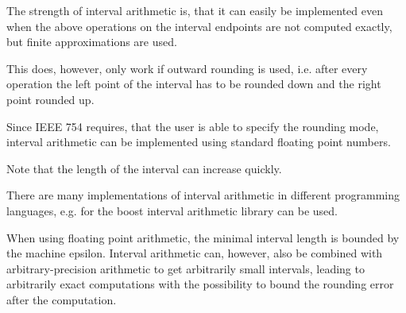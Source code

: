 	The strength of interval arithmetic is, that it can easily be implemented even when the above 
	operations on the interval endpoints are not computed exactly, but finite approximations are used.
	
	This does, however, only work if outward rounding is used, i.e. 
	after every operation the left point of the interval has to be rounded down and the right point rounded up.

	Since IEEE 754 requires, that the user is able to specify the rounding mode, interval arithmetic can be implemented 
	using standard floating point numbers.

	Note that the length of the interval can increase quickly.

	There are many implementations of interval arithmetic in different programming languages, e.g. 
	for \cc the boost interval arithmetic library can be used.

  When using floating point arithmetic, the minimal interval length is bounded
  by the machine epsilon.
  Interval arithmetic can, however, also be combined with arbitrary-precision arithmetic to
  get arbitrarily small intervals, leading to arbitrarily exact computations
  with the possibility to bound the rounding error after the computation.

